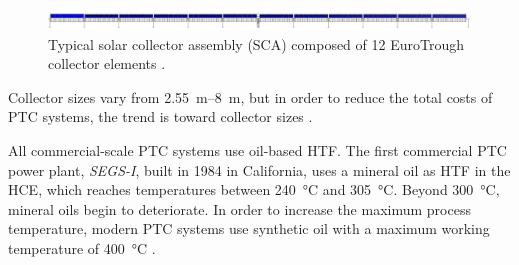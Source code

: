 \begin{figure}[htbp] 
\centering
\includegraphics[width=1\linewidth]{FIG/SCA_EuroTrough}
\caption[Typical solar collector assembly composed of 12 EuroTrough collector elements.]{Typical solar collector assembly (SCA) composed of 12 EuroTrough collector elements \cite{VonReeken2014}.}\label{SCA_EuroTrough}
\end{figure}
%

Collector sizes vary from \SIrange{2.55}{8}{\metre}, but in order to reduce the total costs of \ac{PTC} systems, the trend is toward collector sizes \cite{AbengoaSolar2013b,Pitz-Paal.2013,VonReeken2014}.

All commercial-scale \ac{PTC} systems use oil-based \ac{HTF}. The first commercial \ac{PTC} power plant, \emph{SEGS-I}, built in 1984 in California, uses a mineral oil as \ac{HTF} in the \ac{HCE}, which reaches temperatures between \SI{240}{\celsius} and \SI{305}{\celsius}. Beyond \SI{300}{\celsius}, mineral oils begin to deteriorate. In order to increase the maximum process temperature, modern \ac{PTC} systems use synthetic oil with a maximum working temperature of \SI{400}{\celsius} \cite{Gil2010,Richter2013,Therminol2015}.

%

